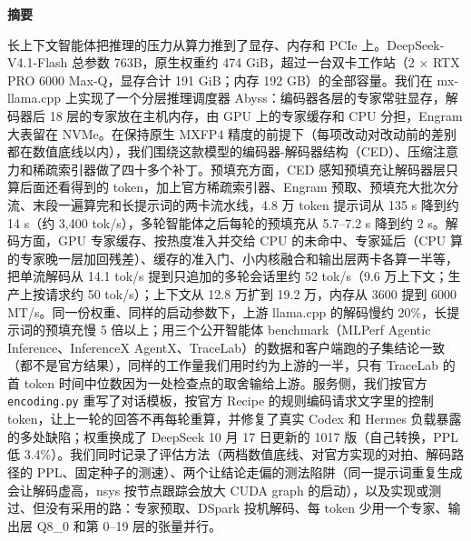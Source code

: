 \documentclass[11pt,a4paper]{article}
\newcommand{\code}[1]{\texttt{#1}}
\newcommand{\tps}{tok/s}
\begin{document}
\vspace{0.4em}
\begin{center}{\large\bfseries 摘要}\end{center}
\vspace{-0.3em}
\noindent
长上下文智能体把推理的压力从算力推到了显存、内存和 PCIe 上。DeepSeek-V4.1-Flash 总参数 763B，原生权重约 474 GiB，超过一台双卡工作站（2 × RTX PRO 6000 Max-Q，显存合计 191 GiB；内存 192 GB）的全部容量。我们在 mx-llama.cpp 上实现了一个分层推理调度器 Abyss：编码器各层的专家常驻显存，解码器后 18 层的专家放在主机内存，由 GPU 上的专家缓存和 CPU 分担，Engram 大表留在 NVMe。在保持原生 MXFP4 精度的前提下（每项改动对改动前的差别都在数值底线以内），我们围绕这款模型的编码器-解码器结构（CED）、压缩注意力和稀疏索引器做了四十多个补丁。预填充方面，CED 感知预填充让解码器层只算后面还看得到的 token，加上官方稀疏索引器、Engram 预取、预填充大批次分流、末段一遍算完和长提示词的两卡流水线，4.8 万 token 提示词从 135 s 降到约 14 s（约 3,400 \tps{}），多轮智能体之后每轮的预填充从 5.7--7.2 s 降到约 2 s。解码方面，GPU 专家缓存、按热度准入并交给 CPU 的未命中、专家延后（CPU 算的专家晚一层加回残差）、缓存的准入门、小内核融合和输出层两卡各算一半等，把单流解码从 14.1 \tps{} 提到只追加的多轮会话里约 52 \tps{}（9.6 万上下文；生产上按请求约 50 \tps{}）；上下文从 12.8 万扩到 19.2 万，内存从 3600 提到 6000 MT/s。同一份权重、同样的启动参数下，上游 llama.cpp 的解码慢约 20\%，长提示词的预填充慢 5 倍以上；用三个公开智能体 benchmark（MLPerf Agentic Inference、InferenceX AgentX、TraceLab）的数据和客户端跑的子集结论一致（都不是官方结果），同样的工作量我们用时约为上游的一半，只有 TraceLab 的首 token 时间中位数因为一处检查点的取舍输给上游。服务侧，我们按官方 \code{encoding.py} 重写了对话模板，按官方 Recipe 的规则编码请求文字里的控制 token，让上一轮的回答不再每轮重算，并修复了真实 Codex 和 Hermes 负载暴露的多处缺陷；权重换成了 DeepSeek 10 月 17 日更新的 1017 版（自己转换，PPL 低 3.4\%）。我们同时记录了评估方法（两档数值底线、对官方实现的对拍、解码路径的 PPL、固定种子的测速）、两个让结论走偏的测法陷阱（同一提示词重复生成会让解码虚高，nsys 按节点跟踪会放大 CUDA graph 的启动），以及实现或测过、但没有采用的路：专家预取、DSpark 投机解码、每 token 少用一个专家、输出层 Q8\_0 和第 0--19 层的张量并行。
\end{document}
